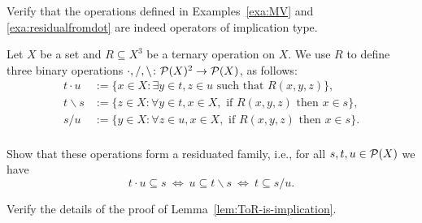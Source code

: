 \begin{exercise} Verify that the operations defined in Examples~\ref{exa:MV} and
\ref{exa:residualfromdot} are indeed operators of implication type.
\end{exercise} \begin{exercise}\label{exe:discrete-dual-res-family} Let $X$ be a
set and $R\subseteq X^3$ be a ternary operation on $X$. We use $R$ to define
three binary operations $\cdot, /, \backslash \colon \mathcal{P}(X)^2 \to \mathcal{P}(X)$, as
follows: \begin{align*} t \cdot u &:= \{x \in X \colon  \exists y \in t, z \in u
\text{ such that } R(x,y,z)\},\\ t \backslash s &:= \{z \in X \colon \forall y
\in t, x \in X, \text{ if } R(x,y,z) \text{ then } x \in s\},\\ s / u &:= \{y
\in X \colon \forall z \in u, x \in X, \text{ if } R(x,y,z) \text{ then } x \in
s\}.\\ \end{align*}

Show that these operations form a residuated family, i.e., for all $s,t,u\in
\mathcal{P}(X)$ we have \[ t \cdot u \subseteq s\ \iff\ u\subseteq t\backslash s\ \iff\
t\subseteq s/u.  \] \end{exercise}
\begin{exercise}\label{ex:ToR-is-implication}
Verify the details of the proof of Lemma~\ref{lem:ToR-is-implication}.
\end{exercise}

